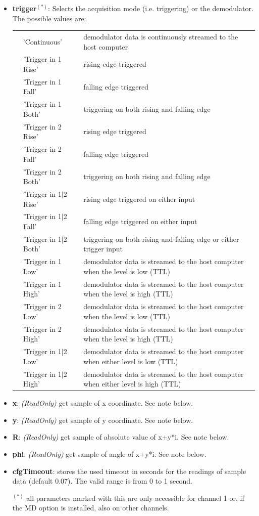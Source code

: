 \documentclass[11pt]{article} %
\begin{document}
\begin{itemize}
	\item {\bf trigger}$^{(*)}$: Selects the acquisition mode (i.e. triggering) or the demodulator. The possible values are:
	\begin{longtable}{p{0.7cm}p{3.1cm}p{12.7cm}}
	&'Continuous' & demodulator data is continuously streamed to the host computer \\
	&'Trigger in 1 Rise' & rising edge triggered \\
	&'Trigger in 1 Fall' & falling edge triggered \\
	&'Trigger in 1 Both' & triggering on both rising and falling edge \\
	&'Trigger in 2 Rise' & rising edge triggered \\
	&'Trigger in 2 Fall' & falling edge triggered \\
	&'Trigger in 2 Both' & triggering on both rising and falling edge \\
	&'Trigger in 1$\mid$2 Rise' & rising edge triggered on either input \\
	&'Trigger in 1$\mid$2 Fall' & falling edge triggered on either input \\
	&'Trigger in 1$\mid$2 Both' & triggering on both rising and falling edge or either trigger input \\
	&'Trigger in 1 Low' & demodulator data is streamed to the host computer when the level is low (TTL) \\
	&'Trigger in 1 High' & demodulator data is streamed to the host computer when the level is high (TTL) \\
	&'Trigger in 2 Low' & demodulator data is streamed to the host computer when the level is low (TTL) \\
	&'Trigger in 2 High' & demodulator data is streamed to the host computer when the level is high (TTL) \\
	&'Trigger in 1$\mid$2 Low' & demodulator data is streamed to the host computer when either level is low (TTL) \\
	&'Trigger in 1$\mid$2 High' & demodulator data is streamed to the host computer when either level is high (TTL) \\
	\end{longtable}
	\item {\bf x}: {\it (ReadOnly)} get sample of x coordinate. See note below.
	\item {\bf y}: {\it (ReadOnly)} get sample of y coordinate. See note below.
	\item {\bf R}: {\it (ReadOnly)} get sample of absolute value of x+y*i. See note below.
	\item {\bf phi}: {\it (ReadOnly)} get sample of angle of x+y*i. See note below.
	\item {\bf cfgTimeout}: stores the  used timeout in seconds for the readings of sample data (default 0.07). The valid range is from 0 to 1 second.
	\item[$^{(*)}$] all parameters marked with this are only accessible for channel 1 or, if the MD option is installed, also on other channels.
	\end{itemize}
\end{document}
